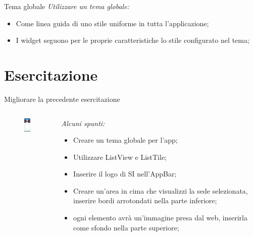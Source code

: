 \documentclass{../libs/presentation_format}
\begin{document}

\begin{frame}{Tema globale}
	\emph{Utilizzare un tema globale:}
	\begin{itemize}
		\item Come linea guida di uno stile uniforme in tutta l'applicazione;
		\item I widget seguono per le proprie caratteristiche lo stile configurato nel tema;
	\end{itemize}
	\centering
	\href{https://api.flutter.dev/flutter/material/ThemeData-class.html}{}
\end{frame}


\section{Esercitazione}
\begin{frame}{Migliorare la precedente esercitazione}
	\begin{minipage}[0.2\textheight]{\textwidth}
		\begin{columns}[T]
			\begin{column}{0.4\textwidth}
				\begin{figure}[htpb]
					\centering
					\includegraphics[width=2cm]{../libs/assignment-2-home}
				\end{figure}
			\end{column}
			\begin{column}{0.6\textwidth}
				\emph{Alcuni spunti:}
				\begin{itemize}
					\item Creare un tema globale per l'app;
					\item Utilizzare ListView e ListTile;
					\item Inserire il logo di SI nell'AppBar;
					\item Creare un'area in cima che visualizzi la sede selezionata, inserire bordi arrotondati nella parte inferiore;
					\item ogni elemento avrà un'immagine presa dal web, inserirla come sfondo nella parte superiore;
				\end{itemize}
			\end{column}
		\end{columns}
	\end{minipage}
\end{frame}
\end{document}
